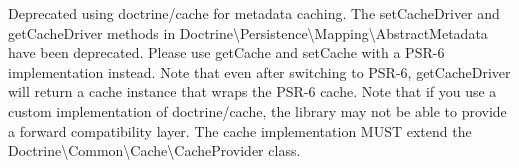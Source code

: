 
\begin{DoxyItemize}
\item Deprecated using doctrine/cache for metadata caching. The {\ttfamily set\+Cache\+Driver} and {\ttfamily get\+Cache\+Driver} methods in {\ttfamily Doctrine\textbackslash{}Persistence\textbackslash{}Mapping\textbackslash{}Abstract\+Metadata} have been deprecated. Please use {\ttfamily get\+Cache} and {\ttfamily set\+Cache} with a PSR-\/6 implementation instead. Note that even after switching to PSR-\/6, {\ttfamily get\+Cache\+Driver} will return a cache instance that wraps the PSR-\/6 cache. Note that if you use a custom implementation of doctrine/cache, the library may not be able to provide a forward compatibility layer. The cache implementation MUST extend the {\ttfamily Doctrine\textbackslash{}Common\textbackslash{}Cache\textbackslash{}Cache\+Provider} class. 
\end{DoxyItemize}